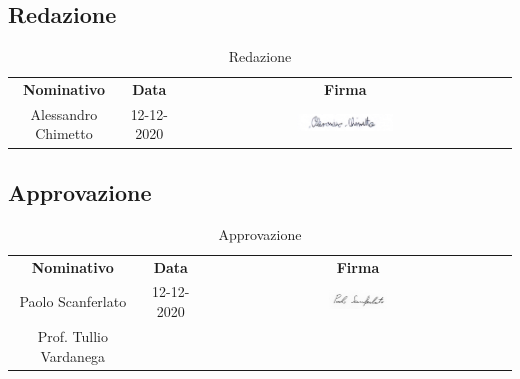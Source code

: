
\subsection{Redazione}

\begin{table} [h!]
	\begin{center}
		\renewcommand{\arraystretch}{3}
		\begin{tabular} { c c c }
			\rowcolor{lightgray}
			\textbf{Nominativo} & \textbf{Data} & \textbf{Firma} \\
			Alessandro Chimetto & 12-12-2020 & \includegraphics[width=0.3\textwidth]{res/img/firme/alessandro_chimetto.jpg}\\
		\end{tabular}
		\caption{Redazione}
	\end{center}
\end{table}


\subsection{Approvazione}

\begin{table} [h!]
	\begin{center}
		\renewcommand{\arraystretch}{3}
		\begin{tabular} { c c c }
			\rowcolor{lightgray}
			\textbf{Nominativo} & \textbf{Data} & \textbf{Firma} \\
			Paolo Scanferlato & 12-12-2020 & \includegraphics[width=0.2\textwidth]{res/img/firme/paolo_scanferlato.jpg}\\
			Prof. Tullio Vardanega & & \\
		\end{tabular}
		\caption{Approvazione}
	\end{center}
\end{table}

\newpage

